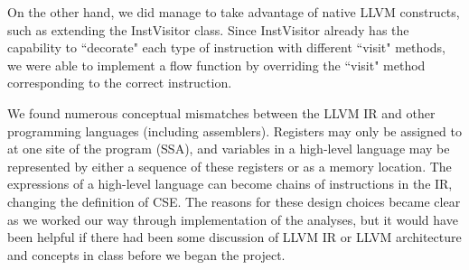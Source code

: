 \documentclass{article}
\theoremstyle{definition}
\begin{document}
On the other hand, we did manage to take advantage of native LLVM
constructs, such as extending the InstVisitor class. Since InstVisitor
already has the capability to ``decorate" each type of instruction
with different ``visit" methods, we were able to implement a flow
function by overriding the ``visit" method corresponding to the
correct instruction.

We found numerous conceptual mismatches between the LLVM IR and other
programming languages (including assemblers). Registers may only be
assigned to at one site of the program (SSA), and variables in a
high-level language may be represented by either a sequence of these
registers or as a memory location. The expressions of a high-level
language can become chains of instructions in the IR, changing the
definition of CSE. The reasons for these design choices became clear
as we worked our way through implementation of the analyses, but it
would have been helpful if there had been some discussion of LLVM IR
or LLVM architecture and concepts in class before we began the
project.
\end{document}
